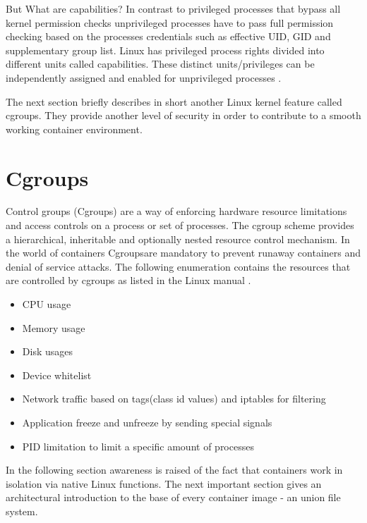 But What are capabilities? In contrast to privileged processes that bypass all kernel permission checks unprivileged processes have to pass full permission checking based on the processes credentials such as effective UID, GID and supplementary group list. 
Linux has privileged process rights divided into different units called capabilities. These distinct units/privileges can be independently assigned and enabled for unprivileged processes \cite{capa}.

The next section briefly describes in short another Linux kernel feature called cgroups. 
They provide another level of security in order to contribute to a smooth working container environment.

\section{Cgroups}
\label{sec:intro:containerization:cgroups}
Control groups (Cgroups) are a way of enforcing hardware resource limitations and access controls on a process or set of processes. 
The cgroup scheme provides a hierarchical, inheritable and optionally nested resource control mechanism.
In the world of containers Cgroupsare mandatory to prevent runaway containers and denial of service attacks.
The following enumeration contains the resources that are controlled by cgroups as listed in the Linux manual \cite{capa}.
\begin{itemize}
\item CPU usage
\item Memory usage
\item Disk usages
\item Device whitelist
\item Network traffic based on tags(class id values) and iptables for filtering
\item Application freeze and unfreeze by sending special signals
\item PID limitation to limit a specific amount of processes 
\end{itemize}

In the following section awareness is raised of the fact that containers work in isolation via native Linux functions.
The next important section gives an architectural introduction to the base of every container image - an union file system.
